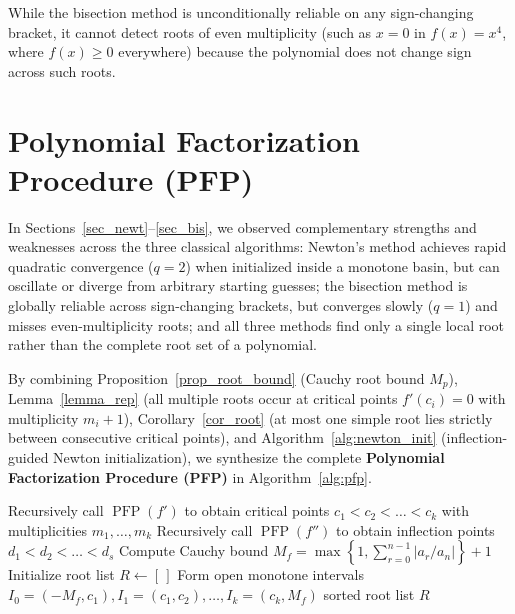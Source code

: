 \documentclass{amsart}
\begin{document}
While the bisection method is unconditionally reliable on any sign-changing bracket, it cannot detect roots of even multiplicity (such as $x = 0$ in $f(x) = x^4$, where $f(x) \geq 0$ everywhere) because the polynomial does not change sign across such roots.

\section{Polynomial Factorization Procedure (PFP)}\label{sec_poly}

In Sections~\ref{sec_newt}--\ref{sec_bis}, we observed complementary strengths and weaknesses across the three classical algorithms: Newton's method achieves rapid quadratic convergence ($q = 2$) when initialized inside a monotone basin, but can oscillate or diverge from arbitrary starting guesses; the bisection method is globally reliable across sign-changing brackets, but converges slowly ($q = 1$) and misses even-multiplicity roots; and all three methods find only a single local root rather than the complete root set of a polynomial.

By combining Proposition~\ref{prop_root_bound} (Cauchy root bound $M_p$), Lemma~\ref{lemma_rep} (all multiple roots occur at critical points $f'(c_i) = 0$ with multiplicity $m_i + 1$), Corollary~\ref{cor_root} (at most one simple root lies strictly between consecutive critical points), and Algorithm~\ref{alg:newton_init} (inflection-guided Newton initialization), we synthesize the complete \textbf{Polynomial Factorization Procedure (PFP)} in Algorithm~\ref{alg:pfp}.

\begin{algorithm}[H]
\caption{Polynomial Factorization Procedure (PFP)}\label{alg:pfp}
Recursively call $\operatorname{PFP}(f')$ to obtain critical points $c_1 < c_2 < \dots < c_k$ with multiplicities $m_1, \dots, m_k$\;
Recursively call $\operatorname{PFP}(f'')$ to obtain inflection points $d_1 < d_2 < \dots < d_s$\;
Compute Cauchy bound $M_f = \max\left\{1, \sum_{r=0}^{n-1} |a_r / a_n|\right\} + 1$\;
Initialize root list $R \gets [\,]$\;
Form open monotone intervals $I_0 = (-M_f, c_1), I_1 = (c_1, c_2), \dots, I_k = (c_k, M_f)$\;
\Return sorted root list $R$\;
\end{algorithm}
\end{document}
